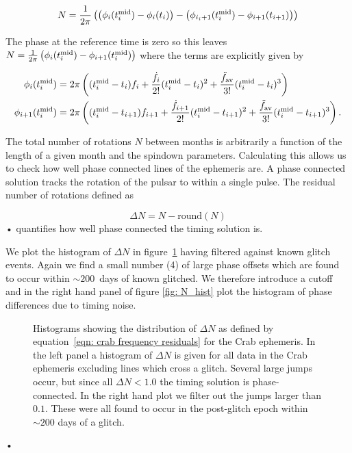 \documentclass[../full_thesis/full_thesis.tex]{subfiles}
\begin{document}
\begin{equation}
    N = \frac{1}{2\pi}\left(\left(\phi_{i}(t^{\textrm{mid}}_{i}) - \phi_{i}(t_{i})\right) -  
    \left(\phi_{i_i+1}(t^{\textrm{mid}}_{i}) - \phi_{i+1}(t_{i+1})\right)\right)
\end{equation}

The phase at the reference time is zero so this leaves $N =
\frac{1}{2\pi}\left(\phi_{i}(t^{\textrm{mid}}_{i}) - \phi_{i+1}(t^{\textrm{mid}}_{i})\right)$ where the terms
are explicitly given by

\begin{align}
\phi_{i}(t^{\textrm{mid}}_{i}) & = 2\pi\left((t^{\textrm{mid}}_{i} - t_{i})f_{i} +  \frac{\dot{f}_{i}}{2!}(t^{\textrm{mid}}_{i} - t_{i})^{2}+\frac{\ddot{f}_{\textrm{av}}}{3!}(t^{\textrm{mid}}_{i} - t_{i})^{3}\right) \\
\phi_{i+1}(t^{\textrm{mid}}_{i}) & = 2\pi\left((t^{\textrm{mid}}_{i} - t_{i+1})f_{i+1} +  \frac{\dot{f}_{i+1}}{2!}(t^{\textrm{mid}}_{i} - t_{i+1})^{2}+\frac{\ddot{f}_{\textrm{av}}}{3!}(t^{\textrm{mid}}_{i} - t_{i+1})^{3}\right) .
\end{align}

The total number of rotations $N$ between months is arbitrarily a function of
the length of a given month and the spindown parameters. Calculating this
allows us to check how well phase connected lines of the ephemeris are. A phase
connected solution tracks the rotation of the pulsar to within a single pulse.
The residual number of rotations defined as

\begin{equation}
\Delta N = N - \textrm{round}(N)
\end{equation}•
quantifies how well phase connected the timing solution is.  

We plot the histogram of $\Delta N$ in figure~\ref{fig: N_hist} having filtered
against known glitch events.  Again we find a small number (4) of large phase
offsets which are found to occur within $\sim200$~days of known glitched. We
therefore introduce a cutoff and in the right hand panel of figure \ref{fig:
N_hist} plot the histogram of phase differences due to timing noise. 
\begin{figure}[ht]
\centering
{}
\caption{Histograms showing the distribution of $\Delta N$ as defined by
    equation~\eqref{eqn: crab frequency residuals} for the Crab ephemeris. In
    the left panel a histogram of $\Delta N$ is given for all data in the Crab
    ephemeris excluding lines which cross a glitch. Several large jumps occur,
    but since all $\Delta N < 1.0$ the timing solution is phase-connected. In
the right hand plot we filter out the jumps larger than $0.1$. These were all
found to occur in the post-glitch epoch within$\sim 200$ days of a glitch.}
\label{fig: N_hist}
\end{figure}•
\end{document}
